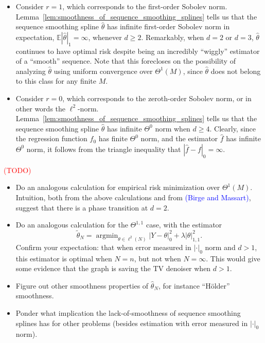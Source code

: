 \documentclass{article}
\newcommand{\1}{\mathbf{1}}
\DeclareMathOperator*{\argmin}{argmin}
\newcommand{\Ebb}{\mathbb{E}}
\newcommand{\wt}[1]{\widetilde{#1}}
\newcommand{\wh}[1]{\widehat{#1}}
\theoremstyle{alden}
\theoremstyle{aldenthm}
\theoremstyle{definition}
\theoremstyle{remark}
\begin{document}
\begin{itemize}
	\item Consider $r = 1$, which corresponds to the first-order Sobolev norm. Lemma~\ref{lem:smoothness_of_sequence_smoothing_splines} tells us that the sequence smoothing spline $\wh{\theta}$ has infinite first-order Sobolev norm in expectation, $\Ebb|\wh{\theta}|_1 = \infty$, whenever $d \geq 2$. Remarkably, when $d = 2$ or $d = 3$, $\wh{\theta}$ continues to have optimal risk despite being an incredibly ``wiggly'' estimator of a ``smooth'' sequence. Note that this forecloses on the possibility of analyzing $\wh{\theta}$ using uniform convergence over $\Theta^1(M)$, since $\wh{\theta}$ does not belong to this class for any finite $M$.
	\item Consider $r = 0$, which corresponds to the zeroth-order Sobolev norm, or in other words the $\ell^2$-norm. Lemma~\ref{lem:smoothness_of_sequence_smoothing_splines} tells us that the sequence smoothing spline $\wh{\theta}$ has infinite $\Theta^0$ norm when $d \geq 4$. Clearly, since the regression function $f_0$ has finite $\Theta^0$ norm, and the estimator $\wh{f}$ has infinite $\Theta^0$ norm, it follows from the triangle inequality that $|\wh{f} - f|_0 = \infty$. 
\end{itemize}

\textcolor{red}{(TODO)}
\begin{itemize}
	\item Do an analogous calculation for empirical risk minimization over $\Theta^1(M)$. Intuition, both from the above calculations and from \textcolor{blue}{(Birge and Massart)}, suggest that there is a phase transition at $d = 2$.  
	\item Do an analogous calculation for the $\Theta^{1,1}$ case, with the estimator
	\begin{equation*}
	\wt{\theta}_{N} = \argmin_{\theta \in \ell^2(N)} |Y - \theta|_0^2 + \lambda |\theta|_{1,1}^2.
	\end{equation*}
	Confirm your expectation: that when error measured in $|\cdot|_0$ norm and $d > 1$, this estimator is optimal when $N = n$, but not when $N = \infty$. This would give some evidence that the graph is saving the TV denoiser when $d > 1$.
	\item Figure out other smoothness properties of $\wh{\theta}_N$, for instance ``H\"{o}lder'' smoothness.
	\item Ponder what implication the lack-of-smoothness of sequence smoothing splines has for other problems (besides estimation with error measured in $|\cdot|_0$ norm).
\end{itemize}
\end{document}
